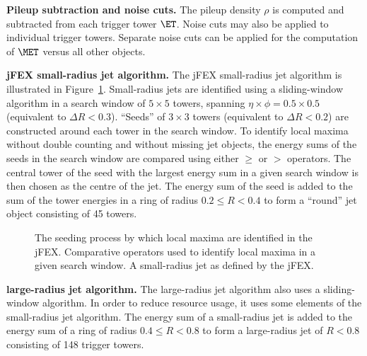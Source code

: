 \documentclass[cernpreprint, atlasdraft=false, UKenglish,british,orcidlogo, texmf, orcidlogo]{atlasdoc}
\begin{document}
\textbf{Pileup subtraction and noise cuts.} The pileup density $\rho$ is computed and subtracted from each trigger tower $\ET$.  Noise cuts may also be applied to individual trigger towers.  Separate noise cuts can be applied for the computation of $\MET$ versus all other objects.
 
\textbf{\gls{jFEX} small-radius jet algorithm.} The \gls{jFEX} small-radius jet algorithm is illustrated in Figure~\ref{fig:TDAQL1CalojFEXSmallRJet}.  Small-radius jets are identified using a sliding-window algorithm in a search window of $5 \times 5$ towers, spanning $\eta \times \phi = 0.5 \times 0.5$ (equivalent to $\Delta R < 0.3$).  ``Seeds'' of $3 \times 3$ towers (equivalent to $\Delta R < 0.2$) are constructed around each tower in the search window.
To identify local maxima without double counting and without missing jet objects,  the energy sums of the seeds in the search window are compared using either $\geq$ or $>$ operators.
The central tower of the seed with the largest energy sum in a given search window is then chosen as the centre of the jet.  The energy sum of the seed is added to the sum of the tower energies in a ring of radius $0.2 \leq R < 0.4$ to form a ``round'' jet object consisting of 45 towers. 
 
\begin{figure}[htbp]
\centering
{}
\caption{
\protect{} The seeding process by which local maxima are identified in the \gls{jFEX}.
\protect{} Comparative operators used to identify local maxima in a given search window.
\protect{} A small-radius jet as defined by the \gls{jFEX}.
}
\label{fig:TDAQL1CalojFEXSmallRJet}
\end{figure}
 
\textbf{ large-radius jet algorithm.} The large-radius jet algorithm also uses a sliding-window algorithm.  In order to reduce resource usage, it uses some elements of the small-radius jet algorithm.  The energy sum of a small-radius jet is added to the energy sum of a ring of radius $0.4 \leq R < 0.8$ to form a large-radius jet of $R < 0.8$ consisting of 148 trigger towers.
 
\end{document}
